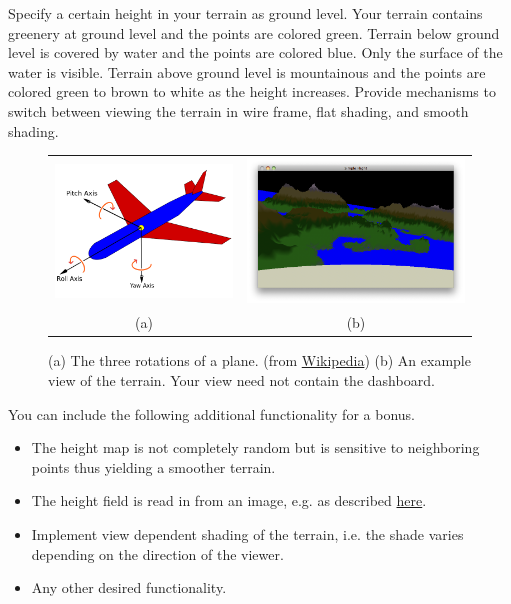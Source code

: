 \documentclass[addpoints]{exam}
\begin{document}
\begin{questions}
  Specify a certain height in your terrain as ground level. Your terrain contains greenery at ground level and the points are colored green. Terrain below ground level is covered by water and the points are colored blue. Only the surface of the water is visible. Terrain above ground level is mountainous and the points are colored green to brown to white as the height increases. Provide mechanisms to switch between viewing the terrain in wire frame, flat shading, and smooth shading.
  \begin{figure}[!h]
    \centering
    \begin{tabular}{cc}
      \includegraphics[height=.35\textwidth]{plane}
      &   \includegraphics[height=.35\textwidth]{view}\\
      (a) & (b)
    \end{tabular}
    \caption{(a) The three rotations of a plane. (from \href{https://en.wikipedia.org/wiki/Flight_dynamics_(fixed-wing_aircraft}{Wikipedia}) (b) An example view of the terrain. Your view need not contain the dashboard.}
  \end{figure}

  You can include the following additional functionality for a bonus.
  \begin{itemize}
  \item The height map is not completely random but is sensitive to neighboring points thus yielding a smoother terrain.
  \item The height field is read in from an image, e.g. as described \href{http://www.cs.cmu.edu/~jkh/462_s07/assts/assignment1/}{here}.
  \item Implement view dependent shading of the terrain, i.e. the shade varies depending on the direction of the viewer.
  \item Any other desired functionality.
  \end{itemize}

\end{questions}
\end{document}
